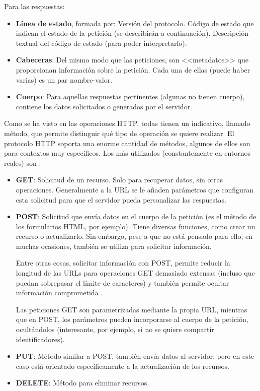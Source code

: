 Para las respuestas:
\begin{itemize}
	\item \textbf{Línea de estado}, formada por:
  \subitem Versión del protocolo.
  \subitem Código de estado que indican el estado de la petición (se describirán a continuación).
  \subitem Descripción textual del código de estado (para poder interpretarlo).
	\item \textbf{Cabeceras}: Del mismo modo que las peticiones, son <<metadatos>> que
  proporcionan información sobre la petición. Cada una de ellas (puede haber
  varias) es un par nombre-valor.
  \item \textbf{Cuerpo}: Para aquellas respuestas pertinentes (algunas no tienen cuerpo),
  contiene los datos solicitados o generados por el servidor.
\end{itemize}


Como se ha visto en las operaciones HTTP, todas tienen un indicativo, llamado
método, que permite distinguir qué tipo de operación se quiere realizar. El
protocolo HTTP soporta una enorme cantidad de métodos, algunos de ellos son para
contextos muy específicos. Los más utilizados (constantemente en entornos
reales) son \cite{enwiki:1151700575}:
\begin{itemize}
	\item \textbf{GET}: Solicitud de un recurso. Solo para recuperar datos, sin
  otras operaciones. Generalmente a la URL se le añaden parámetros que
  configuran esta solicitud para que el servidor pueda personalizar las
  respuestas.
  \item \textbf{POST}: Solicitud que envía datos en el cuerpo de la petición (es
  el método de los formularios HTML, por ejemplo). Tiene diversas funciones,
  como crear un recurso o actualizarlo. Sin embargo, pese a que no está pensado
  para ello, en muchas ocasiones, también se utiliza para solicitar información.
  
  Entre otras cosas, solicitar información con POST, permite reducir la longitud
  de las URLs para operaciones GET demasiado extensas (incluso que puedan
  sobrepasar el límite de caracteres) y también permite ocultar información
  comprometida \cite{http:postnotget}. 
  
  Las peticiones GET son parametrizadas mediante la propia URL, mientras que en
  POST, los parámetros pueden incorporarse al cuerpo de la petición,
  ocultándolos (interesante, por ejemplo, si no se quiere compartir
  identificadores).
  \item \textbf{PUT}: Método similar a POST, también envía datos al servidor,
  pero en este caso está orientado específicamente a la actualización de los
  recursos.
  \item \textbf{DELETE}: Método para eliminar recursos.
\end{itemize}

